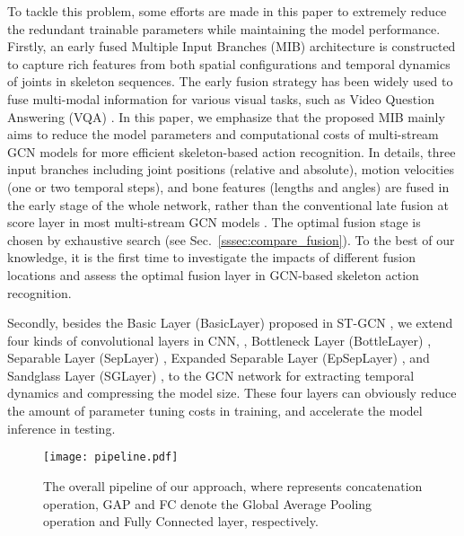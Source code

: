 \documentclass[10pt,journal,compsoc]{IEEEtran}
\begin{document}
To tackle this problem, some efforts are made in this paper to extremely reduce the redundant trainable parameters while maintaining the model performance. Firstly, an early fused Multiple Input Branches (MIB) architecture is constructed to capture rich features from both spatial configurations and temporal dynamics of joints in skeleton sequences. The early fusion strategy has been widely used to fuse multi-modal information for various visual tasks, such as Video Question Answering (VQA) \cite{huang2020location}. In this paper, we emphasize that the proposed MIB mainly aims to reduce the model parameters and computational costs of multi-stream GCN models for more efficient skeleton-based action recognition. In details, three input branches including joint positions (relative and absolute), motion velocities (one or two temporal steps), and bone features (lengths and angles) are fused in the early stage of the whole network, rather than the conventional late fusion at score layer in most multi-stream GCN models \cite{shi2019two,liu2020disentangling,chen2021multi}. The optimal fusion stage is chosen by exhaustive search (see Sec.~\ref{sssec:compare_fusion}). To the best of our knowledge, it is the first time to investigate the impacts of different fusion locations and assess the optimal fusion layer in GCN-based skeleton action recognition.

Secondly, besides the Basic Layer (BasicLayer) proposed in ST-GCN \cite{yan2018spatial}, we extend four kinds of convolutional layers in CNN, \ie, Bottleneck Layer (BottleLayer) \cite{he2016deep}, Separable Layer (SepLayer) \cite{howard2017mobilenets}, Expanded Separable Layer (EpSepLayer) \cite{sandler2018mobilenetv2}, and Sandglass Layer (SGLayer) \cite{zhou2020rethinking}, to the GCN network for extracting temporal dynamics and compressing the model size. These four layers can obviously reduce the amount of parameter tuning costs in training, and accelerate the model inference in testing.

\begin{figure}[t]
  \centerline{\texttt{[image: pipeline.pdf]}}
  \vspace{-0.4cm}
  \caption{The overall pipeline of our approach, where  represents concatenation operation, GAP and FC denote the Global Average Pooling operation and Fully Connected layer, respectively. \bv}\label{fig:pipeline}
  \vspace{-0.4cm}
\end{figure}
\end{document}
